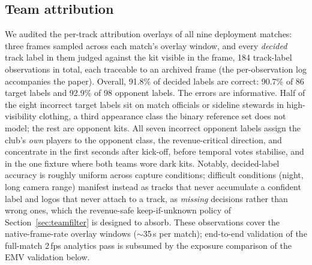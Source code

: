 \documentclass[conference,a4paper]{IEEEtran}
\begin{document}
\subsection{Team attribution}
\label{sec:exp-teamattr}
We audited the per-track attribution overlays of all nine deployment matches: three
frames sampled across each match's overlay window, and every \emph{decided} track
label in them judged against the kit visible in the frame, 184 track-label
observations in total, each traceable to an archived frame (the per-observation log
accompanies the paper). Overall, 91.8\% of decided labels are correct: 90.7\% of 86
target labels and 92.9\% of 98 opponent labels. The errors are informative. Half of
the eight incorrect target labels sit on match officials or sideline stewards in
high-visibility clothing, a third appearance class the binary reference set does not
model; the rest are opponent kits. All seven incorrect opponent labels assign the
club's \emph{own} players to the opponent class, the revenue-critical direction, and
concentrate in the first seconds after kick-off, before temporal votes stabilise,
and in the one fixture where both teams wore dark kits. Notably, decided-label
accuracy is roughly uniform across capture conditions; difficult conditions (night,
long camera range) manifest instead as tracks that never accumulate a confident label
and logos that never attach to a track, as \emph{missing} decisions rather than
wrong ones, which the revenue-safe keep-if-unknown policy of Section~\ref{sec:teamfilter}
is designed to absorb. These observations cover the native-frame-rate overlay windows
($\sim$35\,s per match); end-to-end validation of the full-match 2\,fps analytics
pass is subsumed by the exposure comparison of the EMV validation below.
\end{document}

